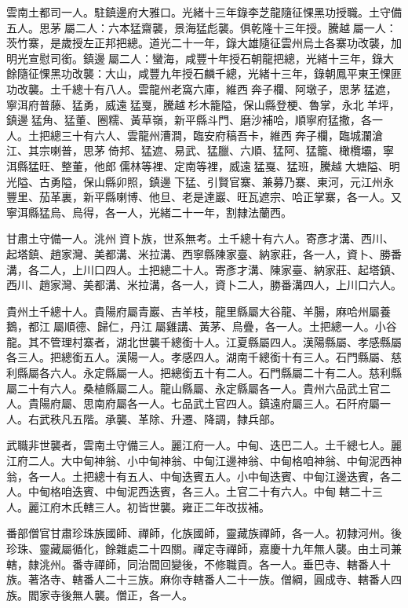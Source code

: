 \begin{pinyinscope}
雲南土都司一人。駐鎮邊府大雅口。光緒十三年錄李芝龍隨征惈黑功授職。土守備五人。思茅屬二人：六本猛齋襲，景海猛彪襲。俱乾隆十三年授。騰越屬一人：茨竹寨，是歲授左正邦把總。道光二十一年，錄大雄隨征雲州烏土各寨功改襲，加明光宣慰司銜。鎮邊屬二人：蠻海，咸豐十年授石朝龍把總，光緒十三年，錄大餘隨征惈黑功改襲：大山，咸豐九年授石麟千總，光緒十三年，錄朝鳳平東王惈匪功改襲。土千總十有八人。雲龍州老窩六庫，維西奔子欄、阿墩子，思茅猛遮，寧洱府普藤、猛勇，威遠猛戛，騰越杉木籠隘，保山縣登梗、魯掌，永北羊坪，鎮邊猛角、猛董、圈糯、黃草嶺，新平縣斗門、磨沙補哈，順寧府猛撒，各一人。土把總三十有六人、雲龍州漕澗，臨安府稿吾卡，維西奔子欄，臨城瀾滄江、其宗喇普，思茅倚邦、猛遮、易武、猛臘、六順、猛阿、猛籠、橄欖壩，寧洱縣猛旺、整董，他郎儒林等裡、定南等裡，威遠猛戛、猛班，騰越大塘隘、明光隘、古勇隘，保山縣卯照，鎮邊下猛、引賢官寨、兼募乃寨、東河，元江州永豐里、茄革裏，新平縣喇博、他旦、老是達巖、旺瓦遮宗、哈正掌寨，各一人。又寧洱縣猛烏、烏得，各一人，光緒二十一年，割隸法蘭西。

甘肅土守備一人。洮州資卜族，世系無考。土千總十有六人。寄彥才溝、西川、起塔鎮、趙家灣、美都溝、米拉溝、西寧縣陳家臺、納家莊，各一人，資卜、勝番溝，各二人，上川口四人。土把總二十人。寄彥才溝、陳家臺、納家莊、起塔鎮、西川、趙家灣、美都溝、米拉溝，各一人，資卜二人，勝番溝四人，上川口六人。

貴州土千總十人。貴陽府屬青巖、吉羊枝，龍里縣屬大谷龍、羊腸，麻哈州屬養鵝，都江屬順德、歸仁，丹江屬雞講、黃茅、烏疊，各一人。土把總一人。小谷龍。其不管理村寨者，湖北世襲千總銜十人。江夏縣屬四人。漢陽縣屬、孝感縣屬各三人。把總銜五人。漢陽一人。孝感四人。湖南千總銜十有三人。石門縣屬、慈利縣屬各六人。永定縣屬一人。把總銜五十有二人。石門縣屬二十有二人。慈利縣屬二十有六人。桑植縣屬二人。龍山縣屬、永定縣屬各一人。貴州六品武土官二人。貴陽府屬、思南府屬各一人。七品武土官四人。鎮遠府屬三人。石阡府屬一人。右武秩凡五階。承襲、革除、升遷、降調，隸兵部。

武職非世襲者，雲南土守備三人。麗江府一人。中甸、迭巴二人。土千總七人。麗江府二人。大中甸神翁、小中甸神翁、中甸江邊神翁、中甸格咱神翁、中甸泥西神翁，各一人。土把總十有五人、中甸迭賓五人。小中甸迭賓、中甸江邊迭賓，各二人。中甸格咱迭賓、中甸泥西迭賓，各三人。土官二十有六人。中甸轄二十三人。麗江府木氏轄三人。初皆世襲。雍正二年改拔補。

番部僧官甘肅珍珠族國師、禪師，化族國師，靈藏族禪師，各一人。初隸河州。後珍珠、靈藏屬循化，餘雜處二十四關。禪定寺禪師，嘉慶十九年無人襲。由土司兼轄，隸洮州。番寺禪師，同治間回變後，不修職貢。各一人。垂巴寺、轄番人十族。著洛寺、轄番人二十三族。麻你寺轄番人二十一族。僧綱，圓成寺、轄番人四族。閻家寺後無人襲。僧正，各一人。


\end{pinyinscope}